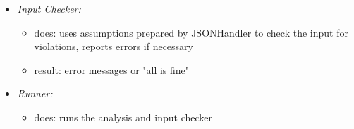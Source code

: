 \documentclass[11pt]{article}
\begin{document}
\begin{itemize}


\item \textit{Input Checker:} 
\begin{itemize}
\item does: uses assumptions prepared by JSONHandler to check the input for violations, reports errors if necessary
\item result: error messages or "all is fine"
\end{itemize}


\item \textit{Runner:} 
\begin{itemize}
\item does: runs the analysis and input checker
\end{itemize}

\end{itemize}
\end{document}
